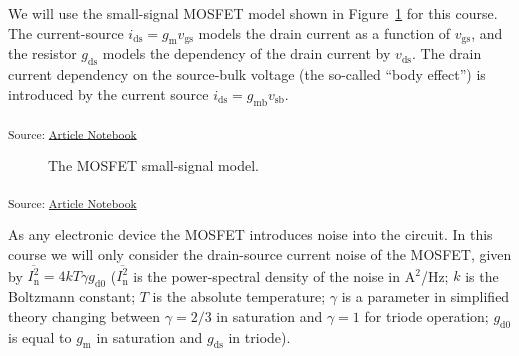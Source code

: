 \documentclass[
  a4paper,
  DIV=11,
  numbers=noendperiod]{scrartcl}
\begin{document}
We will use the small-signal MOSFET model shown in
Figure~\ref{fig-mosfet-small-signal-model} for this course. The
current-source \(i_\mathrm{ds}= g_\mathrm{m}v_\mathrm{gs}\) models the
drain current as a function of \(v_\mathrm{gs}\), and the resistor
\(g_\mathrm{ds}\) models the dependency of the drain current by
\(v_\mathrm{ds}\). The drain current dependency on the source-bulk
voltage (the so-called ``body effect'') is introduced by the current
source \(i_\mathrm{ds}= g_\mathrm{mb} v_\mathrm{sb}\).

\textsubscript{Source:
\href{https://iic-jku.github.io/analog-circuit-design/index.qmd.html}{Article
Notebook}}

\begin{figure}[H]


\caption{\label{fig-mosfet-small-signal-model}The MOSFET small-signal
model.}

\end{figure}%

\textsubscript{Source:
\href{https://iic-jku.github.io/analog-circuit-design/index.qmd.html}{Article
Notebook}}

As any electronic device the MOSFET introduces noise into the circuit.
In this course we will only consider the drain-source current noise of
the MOSFET, given by
\(\overline{I_\mathrm{n}^2} = 4 k T \gamma g_\mathrm{d0}\)
(\(\overline{I_\mathrm{n}^2}\) is the power-spectral density of the
noise in A\(^2\)/Hz; \(k\) is the Boltzmann constant; \(T\) is the
absolute temperature; \(\gamma\) is a parameter in simplified theory
changing between \(\gamma = 2/3\) in saturation and \(\gamma =1\) for
triode operation; \(g_\mathrm{d0}\) is equal to \(g_\mathrm{m}\) in
saturation and \(g_\mathrm{ds}\) in triode).
\end{document}
